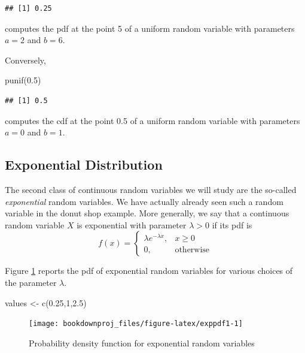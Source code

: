 \documentclass[
]{book}
\newenvironment{Shaded}{\begin{snugshade}}{\end{snugshade}}
\newcommand{\DecValTok}[1]{\textcolor[rgb]{0.00,0.00,0.81}{#1}}
\newcommand{\FloatTok}[1]{\textcolor[rgb]{0.00,0.00,0.81}{#1}}
\newcommand{\FunctionTok}[1]{\textcolor[rgb]{0.00,0.00,0.00}{#1}}
\newcommand{\NormalTok}[1]{#1}
\newcommand{\OtherTok}[1]{\textcolor[rgb]{0.56,0.35,0.01}{#1}}
\begin{document}
\begin{verbatim}
## [1] 0.25
\end{verbatim}

computes the pdf at the point 5 of a uniform random variable with parameters \(a=2\) and \(b=6\).

Conversely,

\begin{Shaded}
\begin{Highlighting}[]
\FunctionTok{punif}\NormalTok{(}\FloatTok{0.5}\NormalTok{)}
\end{Highlighting}
\end{Shaded}

\begin{verbatim}
## [1] 0.5
\end{verbatim}

computes the cdf at the point 0.5 of a uniform random variable with parameters \(a=0\) and \(b=1\).

\hypertarget{exponential-distribution}{%
\subsection{Exponential Distribution}\label{exponential-distribution}}

The second class of continuous random variables we will study are the so-called \emph{exponential} random variables. We have actually already seen such a random variable in the donut shop example. More generally, we say that a continuous random variable \(X\) is exponential with parameter \(\lambda>0\) if its pdf is
\[
f(x) = \left\{
\begin{array}{ll}
\lambda e^{-\lambda x}, & x\geq 0\\
0, & \mbox{otherwise}
\end{array}
\right.
\]

Figure \ref{fig:exppdf1} reports the pdf of exponential random variables for various choices of the parameter \(\lambda\).

\begin{Shaded}
\begin{Highlighting}[]
\NormalTok{values }\OtherTok{\textless{}{-}} \FunctionTok{c}\NormalTok{(}\FloatTok{0.25}\NormalTok{,}\DecValTok{1}\NormalTok{,}\FloatTok{2.5}\NormalTok{)}
\end{Highlighting}
\end{Shaded}

\begin{figure}

{\centering \texttt{[image: bookdownproj\_files/figure-latex/exppdf1-1]} 

}

\caption{Probability density function for exponential random variables}\label{fig:exppdf1}
\end{figure}
\end{document}
